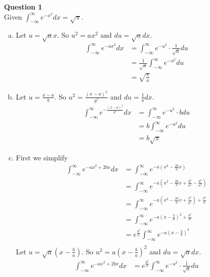 \documentclass[12pt, letterpaper]{article}
\begin{document}
\graphicspath{ {./} }


\noindent \textbf{Question 1} \\
Given $\int_{-\infty}^{\infty} e^{-x^2}dx = \sqrt{\pi}$.
\begin{enumerate}[(a)]
    \item Let $u = \sqrt{a}x$. So $u^2 = ax^2$ and $du = \sqrt{a}dx$.
    \begin{align*}
        \int_{-\infty}^{\infty} e^{-ax^2}dx &= \int_{-\infty}^{\infty} e^{-u^2} \cdot \frac{1}{\sqrt{a}}du \\
        &= \frac{1}{\sqrt{a}} \int_{-\infty}^{\infty}e^{-u^2}du \\
        &= \sqrt{\frac{\pi}{a}}
    \end{align*}
    \item Let $u = \frac{x-a}{b}$. So $u^2 = \frac{(x-a)^2}{b^2}$ and $du = \frac{1}{b}dx$.
    \begin{align*}
        \int_{-\infty}^{\infty} e^{-\frac{(x-a)^2}{b^2}}dx &= \int_{-\infty}^{\infty} e^{-u^2} \cdot bdu \\
        &= b\int_{-\infty}^{\infty} e^{-u^2}du \\
        &= b\sqrt{\pi}
    \end{align*}
    \item First we simplify
    \begin{align*}
        \int_{-\infty}^{\infty} e^{-ax^2+2bx}dx &= \int_{-\infty}^{\infty} e^{-a\left(x^2-\frac{2b}{a}x\right)} \\
        &= \int_{-\infty}^{\infty} e^{-a\left(x^2-\frac{2b}{a}x + \frac {b^2}{a^2} - \frac {b^2}{a^2} \right)} \\
        &= \int_{-\infty}^{\infty} e^{-a\left(x^2-\frac{2b}{a}x + \frac {b^2}{a^2}\right) + \frac {b^2}{a}} \\
        &= \int_{-\infty}^{\infty} e^{-a\left(x -\frac{b}{a}\right)^2 + \frac {b^2}{a}} \\
        &= e^{\frac {b^2}{a}} \int_{-\infty}^{\infty} e^{-a\left(x -\frac{b}{a}\right)^2} \\
    \end{align*}
    Let $u = \sqrt{a}(x - \frac ba)$. So $u^2 = a(x-\frac ba)^2$ and $du = \sqrt adx$.
    \begin{align*}
        \int_{-\infty}^{\infty} e^{-ax^2+2bx}dx &= e^{\frac {b^2}{a}} \int_{-\infty}^{\infty} e^{-u^2} \cdot \frac{1}{\sqrt a}du \\

\end{align*}
\end{enumerate}
\end{document}
